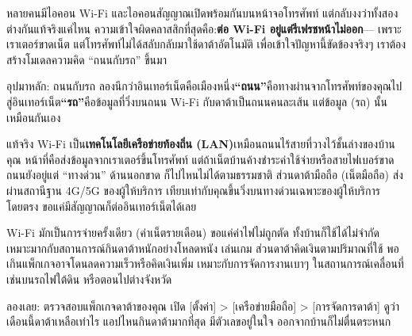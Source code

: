 


หลายคนมีไอคอน Wi-Fi และไอคอนสัญญาณเปิดพร้อมกันบนหน้าจอโทรศัพท์ แต่กลับงงว่าทั้งสองต่างกันแท้จริงแค่ไหน ความเข้าใจผิดคลาสสิกที่สุดคือ:\textbf{ต่อ Wi-Fi อยู่แต่รีเฟรชหน้าไม่ออก}— เพราะเราเตอร์ขาดเน็ต แต่โทรศัพท์ไม่ได้สลับกลับมาใช้ดาต้าอัตโนมัติ เพื่อเข้าใจปัญหานี้ขัดข้องจริงๆ เราต้องสร้างโมเดลความคิด “ถนนกับรถ” ขึ้นมา

\begin{tcbinfo}{อุปมาหลัก: ถนนกับรถ}
ลองนึกว่าอินเทอร์เน็ตคือเมืองหนึ่ง\textbf{“ถนน”}คือทางผ่านจากโทรศัพท์ของคุณไปสู่อินเทอร์เน็ต\textbf{“รถ”}คือข้อมูลที่วิ่งบนถนน Wi-Fi กับดาต้าเป็นถนนคนละเส้น แต่ข้อมูล (รถ) นั้นเหมือนกันเอง

\end{tcbinfo}


แท้จริง Wi-Fi เป็น\textbf{เทคโนโลยีเครือข่ายท้องถิ่น (LAN)}เหมือนถนนไร้สายที่วางไว้ชั้นล่างของบ้านคุณ หน้าที่คือส่งข้อมูลจากเราเตอร์ขึ้นโทรศัพท์ แต่ถ้าเน็ตบ้านค้างชำระค่าใช้จ่ายหรือสายไฟเบอร์ขาด ถนนยังอยู่แต่ “ทางด่วน” ด้านนอกขาด ก็ไปไหนไม่ได้ตามธรรมชาติ ส่วนดาต้ามือถือ (เน็ตมือถือ) ส่งผ่านสถานีฐาน 4G/5G ของผู้ให้บริการ เทียบเท่ากับคุณขึ้นวิ่งบนทางด่วนเฉพาะของผู้ให้บริการโดยตรง ขอแค่มีสัญญาณก็ต่ออินเทอร์เน็ตได้เลย


Wi-Fi มักเป็นการจ่ายครั้งเดียว (ค่าเน็ตรายเดือน) ขอแค่ค่าไฟไม่ถูกตัด ทั้งบ้านก็ใช้ได้ไม่จำกัด เหมาะมากกับสถานการณ์กินดาต้าหนักอย่างโหลดหนัง เล่นเกม ส่วนดาต้าคิดเงินตามปริมาณที่ใช้ พอเกินแพ็กเกจอาจโดนลดความเร็วหรือคิดเงินเพิ่ม เหมาะกับการจัดการงานเบาๆ ในสถานการณ์เคลื่อนที่ เช่นบนรถไฟใต้ดิน หรือตอนไปต่างจังหวัด

\begin{tcbpractice}{ลองเลย: ตรวจสอบแพ็กเกจดาต้าของคุณ}
เปิด [ตั้งค่า] > [เครือข่ายมือถือ] > [การจัดการดาต้า] ดูว่าเดือนนี้ดาต้าเหลือเท่าไร แอปไหนกินดาต้ามากที่สุด มีตัวเลขอยู่ในใจ ออกจากบ้านก็ไม่ตื่นตระหนก

\end{tcbpractice}

